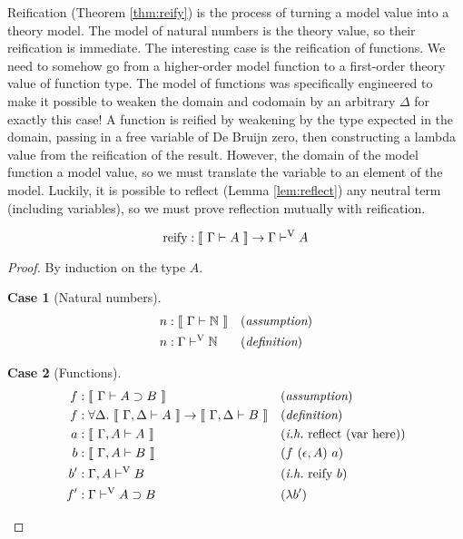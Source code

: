 \documentclass{llncs}
\newtheorem{scase}{Case}
\newcommand{\refthm}[1]{Theorem \ref{thm:#1}}
\newcommand{\reflem}[1]{Lemma \ref{lem:#1}}
\def\arr{\supset}
\def\marr{\rightarrow}
\def\lam{\lambda}
\def\nat{\mathbb{N}}
\def\emp{\epsilon}
\def\reflectn{\fun{reflect}}
\def\reflect{\reflectn}
\def\bydef{(\textit{definition})}
\def\byass{(\textit{assumption})}
\newcommand{\ih}[1]{(\textit{i.h.}~ #1)}
\newcommand{\by}[1]{(#1)}
\newcommand{\turn}[1]{\vdash^\con{#1}}
\newcommand{\all}[1]{\forall#1.~}
\newcommand{\el}[1]{\llbracket ~ #1 ~ \rrbracket}
\newcommand{\con}[1]{\textmd{#1}}
\newcommand{\fun}[1]{\textmd{#1}}
\newcommand{\typm}[1]{\el{\Gamma \vdash #1}}
\newcommand{\gdtypm}[1]{\el{\Gamma, \Delta \vdash #1}}
\newcommand{\gatypm}[1]{\el{\Gamma, A \vdash #1}}
\newcommand{\typv}[1]{\Gamma \turn{V} #1}
\newcommand{\gatypv}[1]{\Gamma, A \turn{V} #1}
\begin{document}
Reification (\refthm{reify}) is the process of turning a model value into a theory
model. The model of natural numbers is the theory value, so their
reification is immediate. The interesting case is the reification of
functions. We need to somehow go from a higher-order model function to
a first-order theory value of function type. The model of functions
was specifically engineered to make it possible to weaken the domain
and codomain by an arbitrary $\Delta$ for exactly this case! A
function is reified by weakening by the type expected in the domain,
passing in a free variable of De Bruijn zero, then constructing a
lambda value from the reification of the result. However, the domain
of the model function a model value, so we must translate the variable
to an element of the model. Luckily, it is possible to
reflect (\reflem{reflect}) any neutral term (including variables),
so we must prove reflection mutually with reification.

\begin{theorem}[Reification]
\label{thm:reify}
$$
\fun{reify} : \typm{A} \marr \typv{A}
$$

\begin{proof}

By induction on the type $A$.

\begin{scase}[Natural numbers]
\begin{align*}
n  &: \typm{\nat} && \byass\\
n  &: \typv{\nat} && \bydef
\end{align*}
\end{scase}

\begin{scase}[Functions]
\begin{align*}
f &: \typm{A \arr B} && \byass\\
f &: \all{\Delta} \gdtypm{A} \marr \gdtypm{B} && \bydef\\
a &: \gatypm{A} && \ih{\reflect~(\con{var here})}\\
b &: \gatypm{B} && \by{f~(\emp, A)~a}\\
b' &: \gatypv{B} && \ih{\fun{reify}~b}\\
f' &: \typv{A \arr B} && \by{\lam b'}
\end{align*}
\end{scase}

\end{proof}

\end{theorem}
\end{document}
